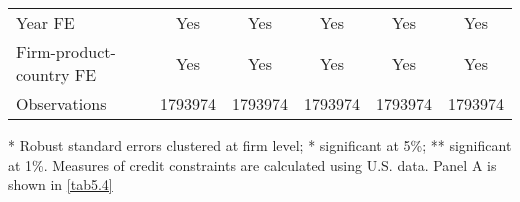 \begin{table}[htbp]
\begin{threeparttable}
\begin{tabular}{lccccc}
		Year FE  & Yes   & Yes   & Yes   & Yes   & Yes \\
		Firm-product-country FE & Yes   & Yes   & Yes   & Yes   & Yes \\
		Observations & 1793974 & 1793974 & 1793974 & 1793974 & 1793974 \\
		\bottomrule
	\end{tabular}
	\begin{tablenotes}
	\footnotesize
	\item[*] Robust standard errors clustered at firm level; * significant at 5\%; ** significant at 1\%. Measures of credit constraints are calculated using U.S. data. Panel A is shown in \ref{tab5.4}
	\end{tablenotes}
	\end{threeparttable}
	\label{tabA.2}
\end{table}

